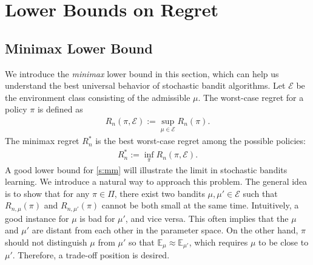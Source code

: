 \documentclass[letterpaper,11pt,openright,openany]{book}
\numberwithin{equation}{section}
\theoremstyle{plain}
\theoremstyle{definition}
\def\E{{\mathbb E}}
\def\V{{\mathcal E}}
\def\e{{\varepsilon}}
\begin{document}



\section{Lower Bounds on Regret}

\subsection{Minimax Lower Bound}

We introduce the \emph{minimax} lower bound in this section, which can help us understand the best universal behavior of stochastic bandit algorithms. Let $\V$ be the environment class consisting of the admissible $\mu$. The worst-case regret for a policy $\pi$ is defined as 
\begin{align*}
R_n(\pi, \V):=\sup_{\mu\in\V}R_n(\pi).
\end{align*}
The minimax regret $R_n^*$ is the best worst-case regret among the possible policies: 
\begin{align}
R_n^*:=\inf_{\pi}R_n(\pi, \V).\label{s:mm}
\end{align}
A good lower bound for \eqref{s:mm} will illustrate the limit in stochastic bandits learning. We introduce a natural way to approach this problem.  The general idea is to show that for any $\pi\in\Pi$, there exist two bandits $\mu, \mu'\in\V$ such that $R_{n,\mu}(\pi)$ and $R_{n,\mu'}(\pi)$ cannot be both small at the same time. Intuitively, a good instance for $\mu$ is bad for $\mu'$, and vice versa. This often implies that the $\mu$ and $\mu'$ are distant from each other in the parameter space. On the other hand, $\pi$ should not distinguish $\mu$ from $\mu'$ so that $\E_\mu\approx\E_{\mu'}$, which requires $\mu$ to be close to $\mu'$. Therefore, a trade-off position is desired.  
\end{document}
